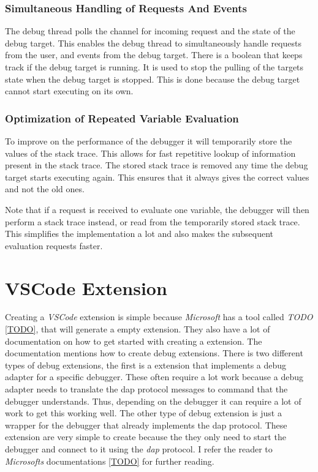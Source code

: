 \subsubsection{Simultaneous Handling of Requests And Events}
The debug thread polls the channel for incoming request and the state of the debug target.
This enables the debug thread to simultaneously handle requests from the user, and events from the debug target.
There is a boolean that keeps track if the debug target is running.
It is used to stop the pulling of the targets state when the debug target is stopped.
This is done because the debug target cannot start executing on its own.


\subsubsection{Optimization of Repeated Variable Evaluation}
To improve on the performance of the debugger it will temporarily store the values of the stack trace.
This allows for fast repetitive lookup of information present in the stack trace.
The stored stack trace is removed any time the debug target starts executing again.
This ensures that it always gives the correct values and not the old ones.


Note that if a request is received to evaluate one variable, the debugger will then perform a stack trace instead, or read from the temporarily stored stack trace.
This simplifies the implementation a lot and also makes the subsequent evaluation requests faster.


\section{VSCode Extension}
Creating a \emph{VSCode} extension is simple because \emph{Microsoft} has a tool called \emph{TODO} \ref{TODO}, that will generate a empty extension.
They also have a lot of documentation on how to get started with creating a extension.
The documentation mentions how to create debug extensions.
There is two different types of debug extensions, the first is a extension that implements a debug adapter for a specific debugger.
These often require a lot work because a debug adapter needs to translate the \gls{dap} protocol messages to command that the debugger understands.
Thus, depending on the debugger it can require a lot of work to get this working well.
The other type of debug extension is just a wrapper for the debugger that already implements the \gls{dap} protocol.
These extension are very simple to create because the they only need to start the debugger and connect to it using the \emph{dap} protocol.
I refer the reader to \emph{Microsofts} documentations \ref{TODO} for further reading.

